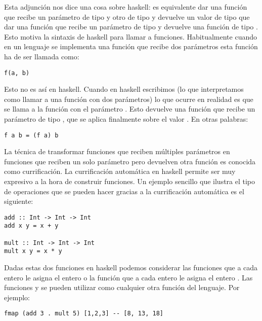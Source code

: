 Esta adjunción nos dice una cosa sobre haskell: es equivalente
dar una función que recibe un parámetro de tipo
 y otro de tipo  y devuelve un valor de tipo  que dar
una función que recibe un parámetro de tipo  y devuelve
una función de tipo . Esto motiva la sintaxis de
haskell para llamar a funciones. Habitualmente cuando en un lenguaje
se implementa una función  que recibe dos parámetros
esta función ha de ser llamada como:
\begin{verbatim}
f(a, b)
\end{verbatim}
Esto no es así en haskell. Cuando en haskell escribimos
 (lo que interpretamos como llamar a una función con dos
parámetros) lo que ocurre en realidad es que se llama a la función
 con el parámetro . Esto devuelve
una función que
recibe un parámetro de tipo , que se aplica finalmente
 sobre el valor
. En otras palabras:
\begin{verbatim}
f a b = (f a) b
\end{verbatim}
La técnica de transformar funciones que reciben
múltiples parámetros en funciones que reciben un solo parámetro
pero devuelven otra función es conocida como currificación.
La currificación automática en haskell
permite ser muy expresivo a la hora de construir funciones. Un
ejemplo sencillo que ilustra el tipo de operaciones que se pueden hacer
gracias a la currificación automática es el siguiente:
\begin{verbatim}
add :: Int -> Int -> Int
add x y = x + y

mult :: Int -> Int -> Int
mult x y = x * y
\end{verbatim}
Dadas estas dos funciones en haskell podemos considerar las funciones
 que a cada entero  le asigna el entero
 o la función  que a cada entero
 le asigna el entero . Las funciones
 y  se pueden utilizar como cualquier otra
función del lenguaje. Por ejemplo:
\begin{verbatim}
fmap (add 3 . mult 5) [1,2,3] -- [8, 13, 18]
\end{verbatim}

